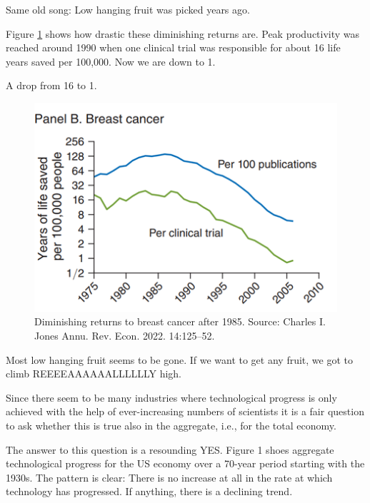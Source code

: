 \documentclass[
]{book}
\begin{document}
Same old song: Low hanging fruit was picked years ago.

Figure \ref{fig:growth19} shows how drastic these diminishing returns are. Peak productivity was reached around 1990 when one clinical trial was responsible for about 16 life years saved per 100,000. Now we are down to 1.

A drop from 16 to 1.

\begin{figure}

{\centering \includegraphics[width=1\linewidth]{img/growth/moore19} 

}

\caption{Diminishing returns to breast cancer after 1985. Source: Charles I. Jones Annu. Rev. Econ. 2022. 14:125–52.}\label{fig:growth19}
\end{figure}

Most low hanging fruit seems to be gone. If we want to get any fruit, we got to climb REEEEAAAAAALLLLLLY high.

Since there seem to be many industries where technological progress is only achieved with the help of ever-increasing numbers of scientists it is a fair question to ask whether this is true also in the aggregate, i.e., for the total economy.

The answer to this question is a resounding YES. Figure 1 shoes aggregate technological progress for the US economy over a 70-year period starting with the 1930s. The pattern is clear: There is no increase at all in the rate at which technology has progressed. If anything, there is a declining trend.
\end{document}
